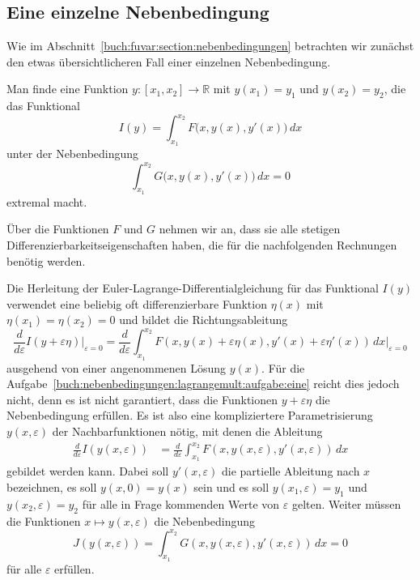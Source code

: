 %
%
\subsection{Eine einzelne Nebenbedingung
\label{buch:nebenbedingungen:lagrangemult:subsection:einzeln}}
Wie im Abschnitt~\ref{buch:fuvar:section:nebenbedingungen} betrachten
wir zunächst den etwas übersichtlicheren Fall einer einzelnen Nebenbedingung.

\begin{aufgabe}
\label{buch:nebenbedingungen:lagrangemult:aufgabe:eine}
Man finde eine Funktion $y\colon[x_1,x_2]\to\mathbb{R}$ mit $y(x_1)=y_1$
und $y(x_2)=y_2$, die das Funktional
\[
I(y)
=
\int_{x_1}^{x_2} F\bigl(x,y(x),y'(x)\bigr)\,dx
\]
unter der Nebenbedingung
\[
\int_{x_1}^{x_2} G\bigl(x,y(x),y'(x)\bigr)\,dx = 0
\]
extremal macht.
\end{aufgabe}

Über die Funktionen $F$ und $G$ nehmen wir an, dass sie alle stetigen
Differenzierbarkeitseigenschaften haben, die für die nachfolgenden
Rechnungen benötig werden.

Die Herleitung der Euler-Lagrange-Differentialgleichung für das
Funktional $I(y)$ verwendet eine beliebig oft differenzierbare 
Funktion $\eta(x)$ mit $\eta(x_1)=\eta(x_2)=0$ und bildet
die Richtungsableitung
\[
\frac{d}{d\varepsilon}
I(y+\varepsilon \eta)
\bigg|_{\varepsilon=0}
=
\frac{d}{d\varepsilon}
\int_{x_1}^{x_2}
F(x,y(x)+\varepsilon\eta(x),y'(x)+\varepsilon \eta'(x))\,dx
\bigg|_{\varepsilon=0}
\]
ausgehend von einer angenommenen Lösung $y(x)$.
Für die Aufgabe~\ref{buch:nebenbedingungen:lagrangemult:aufgabe:eine}
reicht dies jedoch nicht, denn es ist nicht garantiert, dass die
Funktionen $y+\varepsilon\eta$ die Nebenbedingung erfüllen.
Es ist also eine kompliziertere Parametrisierung $y(x,\varepsilon)$
der Nachbarfunktionen nötig, mit denen die Ableitung
\begin{align*}
\frac{d}{d\varepsilon}I(y(x,\varepsilon))
&=
\frac{d}{d\varepsilon}
\int_{x_1}^{x_2}
F(x,y(x,\varepsilon),y'(x,\varepsilon))\,dx
\end{align*}
gebildet werden kann.
Dabei soll $y'(x,\varepsilon)$ die partielle Ableitung nach $x$ 
bezeichnen, es soll $y(x,0)=y(x)$ sein und es soll $y(x_1,\varepsilon)=y_1$
und $y(x_2,\varepsilon)=y_2$
für alle in Frage kommenden Werte von $\varepsilon$ gelten.
Weiter müssen die Funktionen $x\mapsto y(x,\varepsilon)$ die Nebenbedingung
\[
J(y(x,\varepsilon))
=
\int_{x_1}^{x_2} G(x,y(x,\varepsilon),y'(x,\varepsilon))\,dx
=
0
\]
für alle $\varepsilon$ erfüllen.

